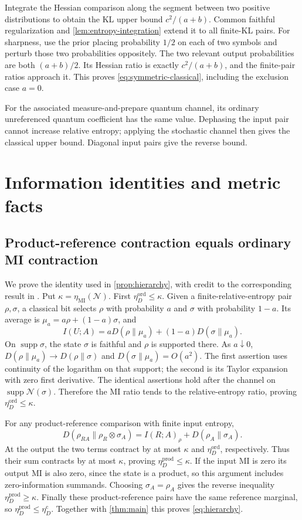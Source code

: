 \documentclass[11pt]{article}
\numberwithin{equation}{section}
\theoremstyle{definition}
\theoremstyle{remark}
\DeclareMathOperator{\supp}{supp}
\newcommand{\N}{\mathcal N}
\newcommand{\etaC}{\eta_D^{\mathrm c}}
\newcommand{\etaMI}{\eta_{\mathrm{MI}}}
\newcommand{\etaOrd}{\eta_D^{\mathrm{ord}}}
\newcommand{\etaP}{\eta_D^{\mathrm{prod}}}
\begin{document}
Integrate the Hessian comparison along the segment between two
positive distributions to obtain the KL upper bound
$c^2/(a+b)$. Common faithful regularization and
\cref{lem:entropy-integration} extend it to all finite-KL pairs.
For sharpness, use the prior placing probability $1/2$ on each of two
symbols and perturb those two probabilities oppositely.
The two relevant output probabilities are both $(a+b)/2$.
Its Hessian ratio is exactly $c^2/(a+b)$, and the finite-pair ratios
approach it. This proves \eqref{eq:symmetric-classical}, including
the exclusion case $a=0$.

For the associated measure-and-prepare quantum channel, its ordinary
unreferenced quantum coefficient has the same value. Dephasing the
input pair cannot increase relative entropy; applying the stochastic
channel then gives the classical upper bound. Diagonal input pairs
give the reverse bound.

\section{Information identities and metric facts}
\label{app:metrics}

\subsection{Product-reference contraction equals ordinary MI contraction}
\label{app:product-mi}

We prove the identity used in \cref{prop:hierarchy}, with credit to the
corresponding result in \cite[Corollary~3]{HGNW26}.
Put $\kappa=\etaMI(\N)$. First $\etaOrd\leq\kappa$.
Given a finite-relative-entropy pair $\rho,\sigma$, a classical bit
selects $\rho$ with probability $a$ and $\sigma$ with probability
$1-a$. Its average is $\mu_a=a\rho+(1-a)\sigma$, and
\[
 I(U;A)=aD(\rho\|\mu_a)+(1-a)D(\sigma\|\mu_a).
\]
On $\supp\sigma$, the state $\sigma$ is faithful and $\rho$ is
supported there. As $a\downarrow0$,
$D(\rho\|\mu_a)\to D(\rho\|\sigma)$ and
$D(\sigma\|\mu_a)=O(a^2)$.
The first assertion uses continuity of the logarithm on that support;
the second is its Taylor expansion with zero first derivative.
The identical assertions hold after the channel on $\supp\N(\sigma)$.
Therefore the MI ratio tends to the relative-entropy ratio, proving
$\etaOrd\leq\kappa$.

For any product-reference comparison with finite input entropy,
\[
 D(\rho_{RA}\|\rho_R\otimes\sigma_A)
 =I(R;A)_\rho+D(\rho_A\|\sigma_A).
\]
At the output the two terms contract by at most $\kappa$ and
$\etaOrd$, respectively. Thus their sum contracts by at most
$\kappa$, proving $\etaP\leq\kappa$.
If the input MI is zero its output MI is also zero, since the state
is a product, so this argument includes zero-information summands.
Choosing $\sigma_A=\rho_A$ gives the reverse inequality
$\etaP\geq\kappa$.
Finally these product-reference pairs have the same reference marginal,
so $\etaP\leq\etaC$. Together with \cref{thm:main} this proves
\eqref{eq:hierarchy}.
\end{document}
